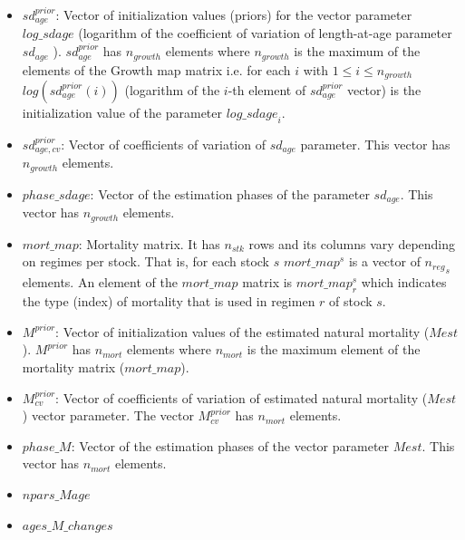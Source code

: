 \documentclass{article}
\begin{document}
\begin{itemize}
    \item $sd_{age}^{prior}$: Vector of initialization values (priors) for the vector parameter $log\_sd{age}$ (logarithm of the coefficient of variation of length-at-age parameter $sd_{age}$ ). $sd_{age}^{prior}$ has $n_{growth}$ elements where $n_{growth}$ is the maximum of the elements of the Growth map matrix i.e. for each $i$ with $1\leq i \leq n_{growth}$ $log(sd_{age}^{prior}(i))$ (logarithm of the $i$-th element of $sd_{age}^{prior}$ vector) is the initialization value of the parameter ${log\_sd{age}}_i$.
    \item $sd_{age,cv}^{prior}$: Vector of coefficients of variation of $sd_{age}$ parameter. This vector has $n_{growth}$ elements.
    \item $phase\_sdage$: Vector of the estimation phases of the  parameter $sd_{age}$. This vector has $n_{growth}$ elements.
    \item $mort\_map$: Mortality matrix. It has $n_{stk}$ rows and its columns vary depending on regimes per stock. That is, for each stock $s$ $mort\_map^s$ is a vector of ${n_{reg}}_s$ elements. An element of the $mort\_map$ matrix is $mort\_map^s_r$ which indicates the type (index) of mortality that is used in regimen $r$ of stock $s$.
    \item $M^{prior}$: Vector of initialization values of the estimated natural mortality ($Mest$). $M^{prior}$ has $n_{mort}$ elements where $n_{mort}$ is the maximum element of the mortality matrix ($mort\_map$).
    \item $M^{prior}_{cv}$: Vector of coefficients of variation of estimated natural mortality ($Mest$) vector parameter. The vector $M^{prior}_{cv}$  has $n_{mort}$ elements.
    \item $phase\_M$: Vector of the estimation phases of the vector parameter $Mest$. This vector has $n_{mort}$ elements.
    \item $npars\_Mage$ 
    \item $ages\_M\_changes$
    

\end{itemize}
\end{document}
